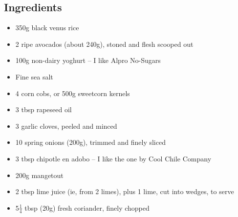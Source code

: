 \documentclass{book}
\begin{document}
\subsection*{Ingredients}
\begin{itemize}
\item 350g black venus rice
\item 2 ripe avocados (about 240g), stoned and flesh scooped out
\item 100g non-dairy yoghurt – I like Alpro No-Sugars
\item Fine sea salt
\item 4 corn cobs, or 500g sweetcorn kernels
\item 3 tbsp rapeseed oil
\item 3 garlic cloves, peeled and minced
\item 10 spring onions (200g), trimmed and finely sliced
\item 3 tbsp chipotle en adobo – I like the one by Cool Chile Company
\item 200g mangetout
\item 2 tbsp lime juice (ie, from 2 limes), plus 1 lime, cut into wedges, to serve
\item 5$\frac{1}{4}$ tbsp (20g) fresh coriander, finely chopped
\end{itemize}
\end{document}
